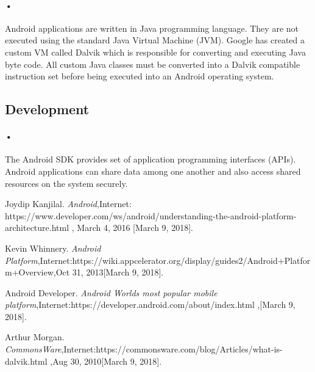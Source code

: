 \documentclass[12pt]{article}
\begin{document}
\paragraph{•}Android applications are written in Java programming language. They are not executed using the standard Java Virtual Machine (JVM). \cite{arthur} Google has created a custom VM called Dalvik which is responsible for converting and executing Java byte code. All custom Java classes must be converted into a Dalvik compatible instruction set before being executed into an Android operating system.

\subsection{ Development}
\paragraph{•}The Android SDK provides set of application programming interfaces (APIs). Android applications can share data among one another and also access shared resources on the system securely.




\begin{thebibliography}{9}
 Joydip Kanjilal. \textit{Android},Internet: https://www.developer.com/ws/android/understanding-the-android-platform-architecture.html , March 4, 2016 [March 9, 2018].

  Kevin Whinnery. \textit{Android Platform},Internet:https://wiki.appcelerator.org/display/guides2/Android+Platform+Overview,Oct 31, 2013[March 9, 2018].

 Android Developer. \textit{Android Worlds most popular mobile platform},Internet:https://developer.android.com/about/index.html ,[March 9, 2018].

 Arthur Morgan. \textit{CommonsWare},Internet:https://commonsware.com/blog/Articles/what-is-dalvik.html ,Aug 30, 2010[March 9, 2018].

\end{thebibliography}
\end{document}
